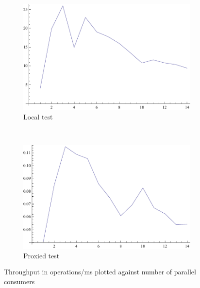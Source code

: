 \documentclass[11pt,a4paper]{article}
\begin{document}
\begin{figure}[h!]
    \centering
    \begin{subfigure}[b]{.4\textwidth}
        \includegraphics[width=\textwidth]{../analysis/throughput-local-kris.pdf}
        \caption{Local test}
    \end{subfigure}
    \,
    \begin{subfigure}[b]{.4\textwidth}
        \includegraphics[width=\textwidth]{../analysis/throughput-remote-kris.pdf}
        \caption{Proxied test}
    \end{subfigure}
    \caption{Throughput in operations/ms plotted against number of parallel consumers}
    \label{throughput}
\end{figure}
\end{document}
